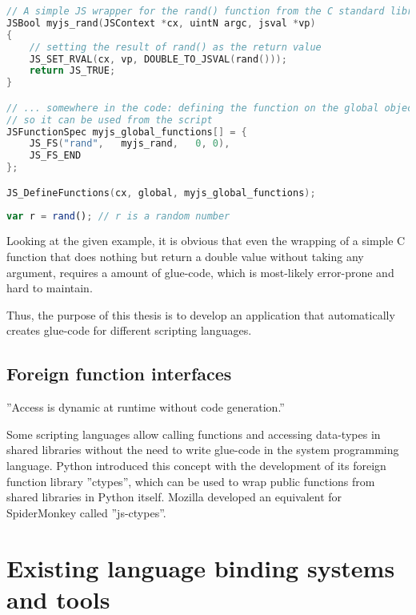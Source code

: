 \begin{lstlisting}[language=C++, caption=Exposing a C function to Spidermonkey (taken from MDN)]
// A simple JS wrapper for the rand() function from the C standard library
JSBool myjs_rand(JSContext *cx, uintN argc, jsval *vp)
{
    // setting the result of rand() as the return value
    JS_SET_RVAL(cx, vp, DOUBLE_TO_JSVAL(rand()));
    return JS_TRUE;
}

// ... somewhere in the code: defining the function on the global object
// so it can be used from the script
JSFunctionSpec myjs_global_functions[] = {
    JS_FS("rand",   myjs_rand,   0, 0),
    JS_FS_END
};

JS_DefineFunctions(cx, global, myjs_global_functions);
\end{lstlisting}

\begin{lstlisting}[language=JavaScript, caption=Using a C function from SpiderMonkey]
var r = rand();	// r is a random number
\end{lstlisting}

Looking at the given example, it is obvious that even the wrapping of a simple C function that does nothing but return a double value without taking any argument, requires a  amount of glue-code, which is most-likely error-prone and hard to maintain.

Thus, the purpose of this thesis is to develop an application that automatically creates glue-code for different scripting languages.

\subsection{Foreign function interfaces}


''Access is dynamic at runtime without code generation.''

Some scripting languages allow calling functions and accessing data-types in shared libraries without the need to write glue-code in the system programming language. Python introduced this concept with the development of its foreign function library ''ctypes'', which can be used to wrap public functions from shared libraries in Python itself. Mozilla developed an equivalent for SpiderMonkey called ''js-ctypes''.

\section{Existing language binding systems and tools}

